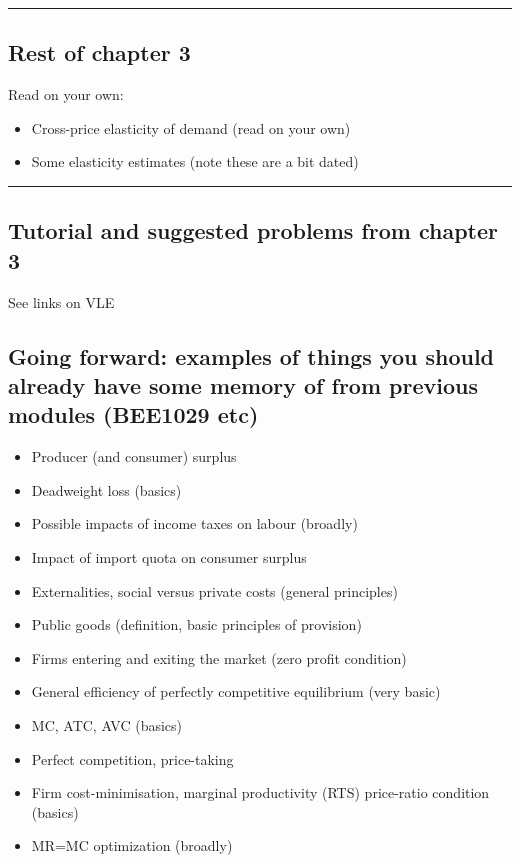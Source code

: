 \documentclass[]{article}
\providecommand{\tightlist}{%
  \setlength{\itemsep}{0pt}\setlength{\parskip}{0pt}}
\begin{document}
\begin{center}\rule{0.5\linewidth}{\linethickness}\end{center}

\hypertarget{rest-of-chapter-3}{%
\subsection{Rest of chapter 3}\label{rest-of-chapter-3}}

Read on your own:

\begin{itemize}
\item
  Cross-price elasticity of demand (read on your own)
\item
  Some elasticity estimates (note these are a bit dated)
\end{itemize}

\begin{center}\rule{0.5\linewidth}{\linethickness}\end{center}

\hypertarget{tutorial-and-suggested-problems-from-chapter-3}{%
\subsection{Tutorial and suggested problems from chapter 3}\label{tutorial-and-suggested-problems-from-chapter-3}}

See links on VLE

\hypertarget{going-forward-examples-of-things-you-should-already-have-some-memory-of-from-previous-modules-bee1029-etc}{%
\subsection{Going forward: examples of things you should already have some memory of from previous modules (BEE1029 etc)}\label{going-forward-examples-of-things-you-should-already-have-some-memory-of-from-previous-modules-bee1029-etc}}

\begin{itemize}
\tightlist
\item
  Producer (and consumer) surplus
\item
  Deadweight loss (basics)
\item
  Possible impacts of income taxes on labour (broadly)
\item
  Impact of import quota on consumer surplus
\item
  Externalities, social versus private costs (general principles)
\item
  Public goods (definition, basic principles of provision)
\item
  Firms entering and exiting the market (zero profit condition)
\item
  General efficiency of perfectly competitive equilibrium (very basic)
\item
  MC, ATC, AVC (basics)
\item
  Perfect competition, price-taking
\item
  Firm cost-minimisation, marginal productivity (RTS) price-ratio condition (basics)
\item
  MR=MC optimization (broadly)
\end{itemize}
\end{document}

